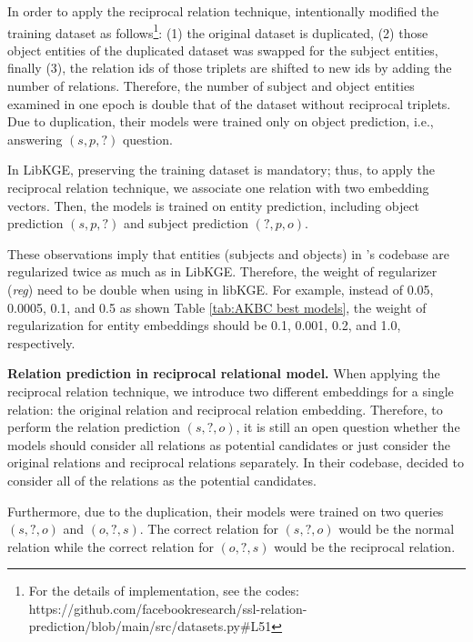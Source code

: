 In order to apply the reciprocal relation technique, \citet{chen2021relation} intentionally modified the training dataset as follows\footnote{For the details of implementation, see the codes: https://github.com/facebookresearch/ssl-relation-prediction/blob/main/src/datasets.py\#L51}: (1) the original dataset is duplicated, (2) those object entities of the duplicated dataset was swapped for the subject entities, finally (3), the relation ids of those triplets are shifted to new ids by adding the number of relations. Therefore, the number of subject and object entities examined in one epoch is double that of the dataset without reciprocal triplets. Due to duplication, their models were trained only on object prediction, i.e., answering $(s,p,?)$ question.

In LibKGE, preserving the training dataset is mandatory; thus, to apply the reciprocal relation technique, we associate one relation with two embedding vectors. Then, the models is trained on entity prediction, including object prediction $(s,p,?)$ and subject prediction $(?,p,o)$. 


These observations imply that entities (subjects and objects) in \citet{chen2021relation}'s codebase are regularized twice as much as in LibKGE. Therefore, the weight of regularizer (\textit{reg}) need to be double when using in libKGE. For example, instead of 0.05, 0.0005, 0.1, and 0.5 as shown Table \ref{tab:AKBC best models}, the weight of regularization for entity embeddings should be 0.1, 0.001, 0.2, and 1.0, respectively.
\newline

\noindent\textbf{Relation prediction in reciprocal relational model.}
When applying the reciprocal relation technique, we introduce two different embeddings for a single relation: the original relation and reciprocal relation embedding. Therefore, to perform the relation prediction $(s,?,o)$, it is still an open question whether the models should consider all relations as potential candidates or just consider the original relations and reciprocal relations separately. In their codebase, \citet{chen2021relation} decided to consider all of the relations as the potential candidates. 

Furthermore, due to the duplication, their models were trained on two queries $(s,?,o)$ and $(o,?,s)$. The correct relation for $(s,?,o)$ would be the normal relation while the correct relation for $(o,?,s)$ would be the reciprocal relation. 
\newline

